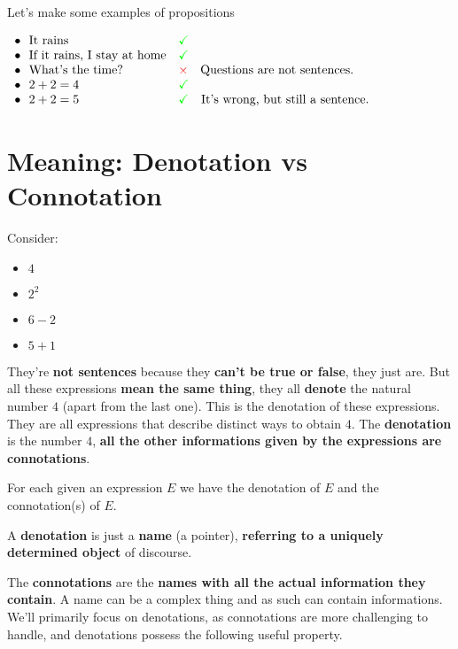 	\begin{example} Let's make some examples of propositions \vspace{0.3cm}

$
\begin{array}{l l}
\bullet \ \ \text{It rains} & {\color{green} \checkmark} \\
\bullet \ \ \text{If it rains, I stay at home} & {\color{green} \checkmark} \\
\bullet \ \ \text{What's the time?} & {\color{red} \times} \quad \text{Questions are not sentences.} \\
\bullet \ \ 2 + 2 = 4 & {\color{green} \checkmark} \\
\bullet \ \ 2 + 2 = 5 & {\color{green} \checkmark} \quad \text{It's wrong, but still a sentence.}
\end{array}
$
	\end{example}

	\section{Meaning: Denotation vs Connotation}
	Consider:
	\begin{itemize}
		\item $4$
		\item $2^2$
		\item $6-2$
		\item $5+1$
	\end{itemize}

	They're \textbf{not sentences} because they \textbf{can't be true or false}, they just are.
	But all these expressions \textbf{mean the same thing}, they all \textbf{denote} the natural number $4$ (apart from the last one). This is the denotation of these expressions.
	They are all expressions that describe distinct ways to obtain $4$. The \textbf{denotation} is the number $4$, \textbf{all the other informations given by the expressions are connotations}.

	For each given an expression $E$ we have the denotation of $E$ and the connotation(s) of $E$.

	A \textbf{denotation} is just a \textbf{name} (a pointer), \textbf{referring to a uniquely determined object} of discourse.

	The \textbf{connotations} are the \textbf{names with all the actual information they contain}. A name can be a complex thing and as such can contain informations. \\

	We'll primarily focus on denotations, as connotations are more challenging to handle, and denotations 	possess the following useful property.

